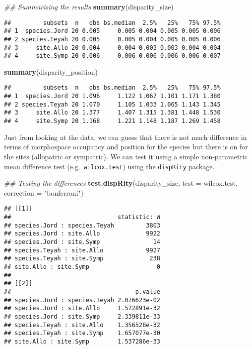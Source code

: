 \documentclass[
]{book}
\newenvironment{Shaded}{\begin{snugshade}}{\end{snugshade}}
\newcommand{\CommentTok}[1]{\textcolor[rgb]{0.56,0.35,0.01}{\textit{#1}}}
\newcommand{\DataTypeTok}[1]{\textcolor[rgb]{0.13,0.29,0.53}{#1}}
\newcommand{\KeywordTok}[1]{\textcolor[rgb]{0.13,0.29,0.53}{\textbf{#1}}}
\newcommand{\NormalTok}[1]{#1}
\newcommand{\StringTok}[1]{\textcolor[rgb]{0.31,0.60,0.02}{#1}}
\begin{document}
\begin{Shaded}
\begin{Highlighting}[]
\CommentTok{\#\# Summarising the results}
\KeywordTok{summary}\NormalTok{(disparity\_size)}
\end{Highlighting}
\end{Shaded}

\begin{verbatim}
##         subsets  n   obs bs.median  2.5%   25%   75% 97.5%
## 1  species.Jord 20 0.005     0.005 0.004 0.005 0.005 0.006
## 2 species.Teyah 20 0.005     0.005 0.004 0.005 0.005 0.006
## 3     site.Allo 20 0.004     0.004 0.003 0.003 0.004 0.004
## 4     site.Symp 20 0.006     0.006 0.006 0.006 0.006 0.007
\end{verbatim}

\begin{Shaded}
\begin{Highlighting}[]
\KeywordTok{summary}\NormalTok{(disparity\_position)}
\end{Highlighting}
\end{Shaded}

\begin{verbatim}
##         subsets  n   obs bs.median  2.5%   25%   75% 97.5%
## 1  species.Jord 20 1.096     1.122 1.067 1.101 1.171 1.380
## 2 species.Teyah 20 1.070     1.105 1.033 1.065 1.143 1.345
## 3     site.Allo 20 1.377     1.407 1.315 1.381 1.448 1.530
## 4     site.Symp 20 1.168     1.221 1.148 1.187 1.269 1.458
\end{verbatim}

Just from looking at the data, we can guess that there is not much difference in terms of morphospace occupancy and position for the species but there is on for the sites (allopatric or sympatric).
We can test it using a simple non-parametric mean difference test (e.g.~\texttt{wilcox.test}) using the \texttt{dispRity} package.

\begin{Shaded}
\begin{Highlighting}[]
\CommentTok{\#\# Testing the differences}
\KeywordTok{test.dispRity}\NormalTok{(disparity\_size, }\DataTypeTok{test =}\NormalTok{ wilcox.test, }\DataTypeTok{correction =} \StringTok{"bonferroni"}\NormalTok{)}
\end{Highlighting}
\end{Shaded}

\begin{verbatim}
## [[1]]
##                              statistic: W
## species.Jord : species.Teyah         3803
## species.Jord : site.Allo             9922
## species.Jord : site.Symp               14
## species.Teyah : site.Allo            9927
## species.Teyah : site.Symp             238
## site.Allo : site.Symp                   0
## 
## [[2]]
##                                   p.value
## species.Jord : species.Teyah 2.076623e-02
## species.Jord : site.Allo     1.572891e-32
## species.Jord : site.Symp     2.339811e-33
## species.Teyah : site.Allo    1.356528e-32
## species.Teyah : site.Symp    1.657077e-30
## site.Allo : site.Symp        1.537286e-33
\end{verbatim}
\end{document}
